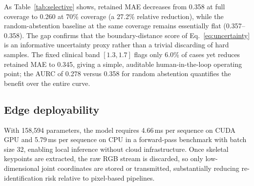 \documentclass[preprint,12pt]{elsarticle}
\begin{document}
\begin{table}[htpb]
\centering
\caption{Selective prediction (risk--coverage) on the combined CNUH+CARE-PD
cohort. At each
target coverage, the threshold $\tau$ flags the most boundary-proximal cases via
Eq.~\eqref{eq:uncertainty}. We report MAE and F1$_{0\text{--}3}$ on the retained
(auto-scored) subset, and the MAE of a random-abstention baseline at matched
coverage. The final row is the fixed clinical band $[1.3,1.7]$.}
\label{tab:selective}
\scriptsize
\setlength{\tabcolsep}{3pt}
\renewcommand{\arraystretch}{0.92}
\end{table}

As Table~\ref{tab:selective} shows, retained MAE decreases from 0.358 at full
coverage to 0.260 at 70\% coverage (a 27.2\% relative reduction), while the
random-abstention baseline at the same coverage remains essentially flat
(0.357--0.358). The gap confirms that the boundary-distance score of
Eq.~\eqref{eq:uncertainty} is an informative uncertainty proxy rather than a
trivial discarding of hard samples. The fixed clinical band $[1.3,1.7]$ flags
only 6.0\% of cases yet reduces retained MAE to 0.345, giving a simple,
auditable human-in-the-loop operating point; the AURC of 0.278 versus 0.358 for
random abstention quantifies the benefit over the entire curve.

\subsection{Edge deployability}
\label{sec:deploy}
With 158{,}594 parameters, the model requires 4.66\,ms per sequence on CUDA GPU
and 5.79\,ms per sequence on CPU in a forward-pass benchmark with batch size 32,
enabling local inference without cloud infrastructure. Once skeletal keypoints are extracted, the raw RGB stream is
discarded, so only low-dimensional joint coordinates are stored or transmitted,
substantially reducing re-identification risk relative to pixel-based pipelines.
\end{document}

